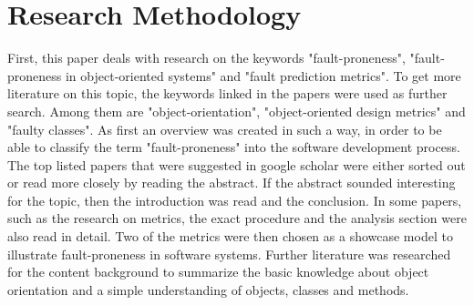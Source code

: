 \section{Research Methodology}\label{research}

First, this paper deals with research on the keywords "fault-proneness", "fault-proneness in object-oriented systems" and "fault prediction metrics". To get more literature on this topic, the keywords linked in the papers were used as further search. Among them are "object-orientation", "object-oriented design metrics" and "faulty classes". As first an overview was created in such a way, in order to be able to classify the term "fault-proneness" into the software development process. The top listed papers that were suggested in google scholar were either sorted out or read more closely by reading the abstract. If the abstract sounded interesting for the topic, then the introduction was read and the conclusion. In some papers, such as the research on metrics, the exact procedure and the analysis section were also read in detail. Two of the metrics were then chosen as a showcase model to illustrate fault-proneness in software systems. Further literature was researched for the content background to summarize the basic knowledge about object orientation and a simple understanding of objects, classes and methods.




